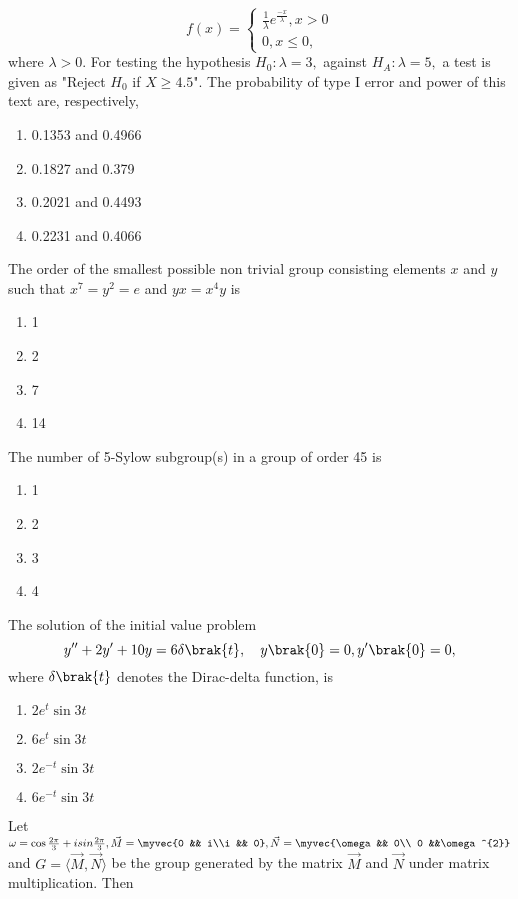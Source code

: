    \[ f(x)=
    \begin{cases}
        \frac{1}{\lambda}e^\frac{-x}{\lambda},x>0\\
        0, x\leq 0,
    \end{cases}
    \]
    where $\lambda>0$. For testing the hypothesis $H_0:\lambda=3,$ against $H_A:\lambda=5,$ a test is given as "Reject $H_0$ if $X\geq 4.5$". The probability of type I error and power of this text are, respectively,
    \begin{enumerate}
        \item 0.1353 and 0.4966
        \item 0.1827 and 0.379
        \item 0.2021 and 0.4493
        \item 0.2231 and 0.4066
    \end{enumerate}
    \item The order of the smallest possible non trivial group consisting elements $x$ and $y$ such that $x^7=y^2=e$ and $yx=x^4y$ is
    \begin{enumerate}
        \item 1
        \item 2
        \item 7
        \item 14
    \end{enumerate}
    \item The number of 5-Sylow subgroup(s) in a group of order 45 is 
    \begin{enumerate}
        \item 1
        \item 2
        \item 3
        \item 4
    \end{enumerate}
    \item The solution of the initial value problem 
    $$y''+2y^{\prime}+10y=6\delta\brak{t},\quad y\brak{0}=0,y^{\prime}\brak{0}=0,$$ where $\delta\brak{t}$ denotes the Dirac-delta function, is
    \begin{enumerate}
        \item $2e^{t}\sin 3t$
        \item $6e^{t}\sin 3t$
        \item $2e^{-t}\sin 3t$
        \item $6e^{-t}\sin 3t$
    \end{enumerate}
    \item Let $\omega=\cos\frac{2\pi}{3}+isin\frac{2\pi}{3},\vec{M}=\myvec{0 && i\\i && 0},\vec{N}=\myvec{\omega && 0\\ 0 &&\omega^{2}}$ and $G=\langle \vec{M} ,\vec{N} \rangle $ be the group generated by the matrix $\vec{M}$ and $\vec{N}$ under matrix multiplication. Then

